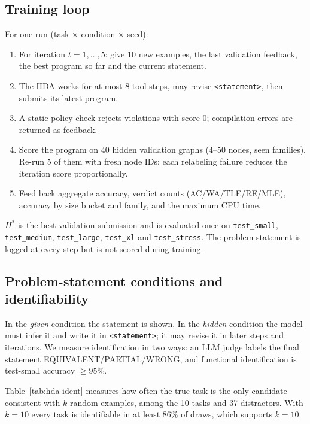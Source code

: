\documentclass[11pt]{article}
\begin{document}
\subsection{Training loop}
For one run (task $\times$ condition $\times$ seed):
\begin{enumerate}
\item For iteration $t=1,\dots,5$: give 10 new examples, the last validation
feedback, the best program so far and the current statement.
\item The HDA works for at most 8 tool steps, may revise \texttt{<statement>},
then submits its latest program.
\item A static policy check rejects violations with score 0; compilation errors
are returned as feedback.
\item Score the program on 40 hidden validation graphs (4--50 nodes, seen
families). Re-run 5 of them with fresh node IDs; each relabeling failure reduces
the iteration score proportionally.
\item Feed back aggregate accuracy, verdict counts (AC/WA/TLE/RE/MLE), accuracy
by size bucket and family, and the maximum CPU time.
\end{enumerate}
$H^*$ is the best-validation submission and is evaluated once on
\texttt{test\_small}, \texttt{test\_medium}, \texttt{test\_large},
\texttt{test\_xl} and \texttt{test\_stress}. The problem statement is logged at
every step but is not scored during training.

\subsection{Problem-statement conditions and identifiability}
\label{sec:hda-ident}
In the \emph{given} condition the statement is shown. In the \emph{hidden}
condition the model must infer it and write it in \texttt{<statement>}; it may
revise it in later steps and iterations. We measure identification in two ways:
an LLM judge labels the final statement EQUIVALENT/PARTIAL/WRONG, and functional
identification is test-small accuracy $\ge 95\%$.

Table~\ref{tab:hda-ident} measures how often the true task is the only candidate
consistent with $k$ random examples, among the 10 tasks and 37 distractors.
With $k=10$ every task is identifiable in at least 86\% of draws, which supports
$k=10$.

\begin{table}[h]
\centering
\small

\caption{Probability that the true task is the unique survivor among 10 tasks
and 37 distractors, and the main confusers at $k=3$ (400 trials).}
\label{tab:hda-ident}
\end{table}
\end{document}
